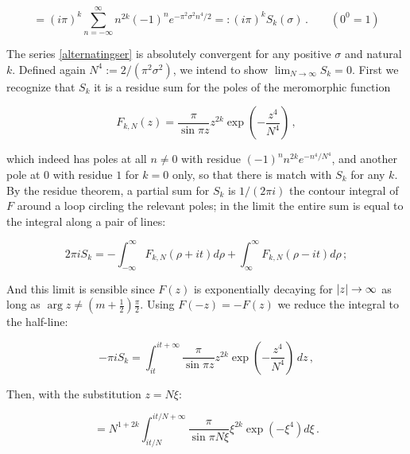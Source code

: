 \documentclass{article}
\newcommand{\sumZ}{\sum_{n=-\infty}^{\infty}}
\begin{document}
\begin{equation}\label{alternatingser}
    = (i\pi)^k \sumZ n^{2k} (-1)^n e^{-\pi^2 \sigma^2 n^4/2} =: (i\pi)^k S_k(\sigma)\,.\quad\quad(0^0 = 1)
\end{equation}

The series \eqref{alternatingser} is absolutely convergent for any positive $\sigma$ and natural $k$. Defined again $N^4 := 2/(\pi^2 \sigma^2)$, we intend to show  $\lim_{N \rightarrow \infty} S_k = 0$. First we recognize that $S_k$ it is a residue sum for the poles of the meromorphic function

\begin{equation}
    F_{k,N}(z) = \frac{\pi}{\sin{\pi z}} z^{2k} \exp(-\frac{z^4}{N^4})\,,
\end{equation}



which indeed has poles at all $n \neq 0$ with residue $(-1)^n n^{2k} e^{-n^4/N^4}$, and another pole at $0$ with residue $1$ for $k=0$ only, so that there is match with $S_k$ for any $k$. By the residue theorem, a partial sum for $S_k$ is $1/(2\pi i)$ the contour integral of $F$ around a loop circling the relevant poles; in the limit the entire sum is equal to the integral along a pair of lines:

\begin{equation}
    2\pi i S_k = -\int_{-\infty}^\infty F_{k,N}(\rho + it) d\rho + \int_\infty^\infty F_{k,N}(\rho-it)d\rho\,;
\end{equation}

And this limit is sensible since $F(z)$ is exponentially decaying for $\abs{z} \rightarrow \infty$ as long as $\arg{z} \neq (m+\frac{1}{2}) \frac{\pi}{2}$. Using $F(-z) = - F(z)$ we reduce the integral to the half-line:

\begin{equation}
    - \pi i S_k = \int_{it}^{it + \infty} \frac{\pi}{\sin{\pi z}} z^{2k} \exp(-\frac{z^4}{N^4})\,dz\,,
\end{equation}

Then, with the substitution $z = N \xi$:

\begin{equation}
    = N^{1+2k} \int_{it/N}^{it/N + \infty} \frac{\pi}{\sin{\pi N \xi}} \xi^{2k} \exp(-\xi^4) d\xi\,.
\end{equation}
\end{document}
